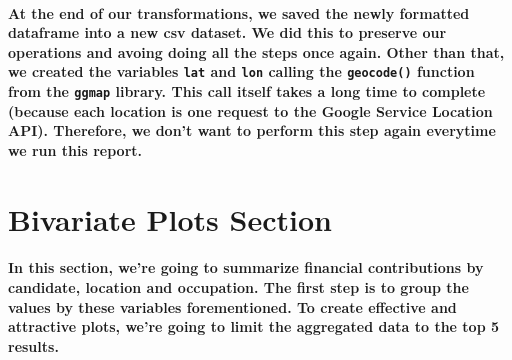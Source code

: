\documentclass[]{article}
\let\oldparagraph\paragraph
\renewcommand{\paragraph}[1]{\oldparagraph{#1}\mbox{}}
\begin{document}
\paragraph{\texorpdfstring{At the end of our transformations, we saved
the newly formatted dataframe into a new csv dataset. We did this to
preserve our operations and avoing doing all the steps once again. Other
than that, we created the variables \texttt{lat} and \texttt{lon}
calling the \texttt{geocode()} function from the \texttt{ggmap} library.
This call itself takes a long time to complete (because each location is
one request to the Google Service Location API). Therefore, we don't
want to perform this step again everytime we run this
report.}{At the end of our transformations, we saved the newly formatted dataframe into a new csv dataset. We did this to preserve our operations and avoing doing all the steps once again. Other than that, we created the variables lat and lon calling the geocode() function from the ggmap library. This call itself takes a long time to complete (because each location is one request to the Google Service Location API). Therefore, we don't want to perform this step again everytime we run this report.}}\label{at-the-end-of-our-transformations-we-saved-the-newly-formatted-dataframe-into-a-new-csv-dataset.-we-did-this-to-preserve-our-operations-and-avoing-doing-all-the-steps-once-again.-other-than-that-we-created-the-variables-lat-and-lon-calling-the-geocode-function-from-the-ggmap-library.-this-call-itself-takes-a-long-time-to-complete-because-each-location-is-one-request-to-the-google-service-location-api.-therefore-we-dont-want-to-perform-this-step-again-everytime-we-run-this-report.}

\section{Bivariate Plots Section}\label{bivariate-plots-section}

\paragraph{In this section, we're going to summarize financial
contributions by candidate, location and occupation. The first step is
to group the values by these variables forementioned. To create
effective and attractive plots, we're going to limit the aggregated data
to the top 5
results.}\label{in-this-section-were-going-to-summarize-financial-contributions-by-candidate-location-and-occupation.-the-first-step-is-to-group-the-values-by-these-variables-forementioned.-to-create-effective-and-attractive-plots-were-going-to-limit-the-aggregated-data-to-the-top-5-results.}
\end{document}
